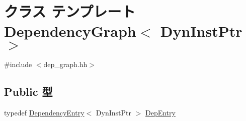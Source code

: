 \hypertarget{classDependencyGraph}{
\section{クラス テンプレート DependencyGraph$<$ DynInstPtr $>$}
\label{classDependencyGraph}
}


{\ttfamily \#include $<$dep\_\-graph.hh$>$}\subsection*{Public 型}
\begin{DoxyCompactItemize}
\item 
typedef \hyperlink{classDependencyEntry}{DependencyEntry}$<$ DynInstPtr $>$ \hyperlink{classDependencyGraph_ab740e4c6c7a7c521e28f61fc991417f8}{DepEntry}
\end{DoxyCompactItemize}
